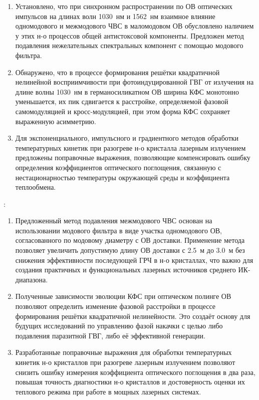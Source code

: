 {\novelty}
\begin{enumerate}[beginpenalty=10000] %
  \item Установлено, что при синхронном распространении по ОВ оптических импульсов на длинах волн 1030~нм и 1562~нм взаимное влияние одномодового и межмодового ЧВС в маломодовом ОВ обусловлено наличием у этих н-о процессов общей антистоксовой компоненты. Предложен метод подавления нежелательных спектральных компонент с помощью модового фильтра.
  
  \item Обнаружено, что в процессе формирования решётки квадратичной нелинейной восприимчивости при фотоиндуцированной ГВГ от излучения на длине волны 1030~нм в германосиликатном ОВ ширина КФС монотонно уменьшается, их пик сдвигается к расстройке, определяемой фазовой самомодуляцией и кросс-модуляцией, при этом форма КФС сохраняет выраженную асимметрию.  
  
  \item Для экспоненциального, импульсного и градиентного методов обработки температурных кинетик при разогреве н-о кристалла лазерным излучением предложены поправочные выражения, позволяющие компенсировать ошибку определения коэффициентов оптического поглощения, связанную с нестационарностью температуры окружающей среды и коэффициента теплообмена.
  
\end{enumerate}

{\influence}:

\begin{enumerate}[beginpenalty=10000] 
	\item Предложенный метод подавления межмодового ЧВС основан на использовании модового фильтра в виде участка одномодового ОВ, согласованного по модовому диаметру с ОВ доставки. Применение метода позволяет увеличить допустимую длину ОВ доставки с 2.5~м до 3.0~м без снижения эффективности последующей ГРЧ в н-о кристаллах, что важно для создания практичных и функциональных лазерных источников среднего ИК-диапазона.
	
	\item Полученные зависимости эволюции КФС при оптическом полинге ОВ позволяют определить изменение фазовой расстройки в процессе формирования решётки квадратичной нелинейности. Это создаёт основу для будущих исследований по управлению фазой накачки с целью либо подавления паразитной ГВГ, либо её эффективной генерации.
	
	\item Разработанные поправочные выражения для обработки температурных кинетик н-о кристаллов при разогреве лазерным излучением позволяют снизить ошибку измерения коэффициента оптического поглощения в два раза, повышая точность диагностики н-о кристаллов и достоверность оценки их теплового режима при работе в мощных лазерных системах.
	
\end{enumerate}
%

